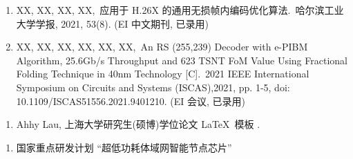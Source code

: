 \begin{publications}
    \begin{enumerate}
        \item XX, XX, XX, XX,\,
              应用于 H.26X 的通用无损帧内编码优化算法.\,
              哈尔滨工业大学学报, 2021, 53(8). (EI 中文期刊, 已录用)

        \item XX, XX, XX, XX, XX, XX,\,
              An RS (255,239) Decoder with e-PIBM Algorithm, 25.6Gb/s Throughput and 623 TSNT FoM Value Using Fractional Folding Technique in 40nm Technology [C].\,
              2021 IEEE International Symposium on Circuits and Systems (ISCAS),2021, pp. 1-5, doi: 10.1109/ISCAS51556.2021.9401210. (EI 会议, 已录用)
    \end{enumerate}

    \begin{enumerate}
        \item Ahhy Lau, 上海大学研究生(硕博)学位论文 \LaTeX\ 模板 \shuthesis.
    \end{enumerate}

    \begin{enumerate}
        \item 国家重点研发计划 “超低功耗体域网智能节点芯片”
    \end{enumerate}
\end{publications}